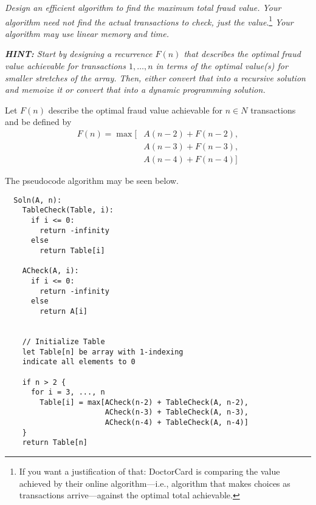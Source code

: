 \documentclass[11pt, oneside]{article}   	%
\theoremstyle{definition}
\theoremstyle{remark}
\begin{document}
\textit{Design an efficient algorithm to find the maximum total fraud
value. Your algorithm need not find the actual transactions to check, just the value}.\footnote{If you want a justification of that: DoctorCard is comparing the value achieved by their online algorithm---i.e., algorithm that makes choices as transactions arrive---against the optimal total achievable.} \textit{Your algorithm may use linear memory and time.}

\textit{\textbf{HINT:} Start by designing a recurrence $F(n)$ that describes the optimal fraud value achievable for transactions $1,\ldots,n$ in terms of the optimal value(s) for smaller stretches of the array. Then,
either convert that into a recursive solution and memoize it or convert that into a dynamic programming solution.}

Let $F(n)$ describe the optimal fraud value achievable for $n\in {N}$ transactions and be defined by
\begin{align*}
	F(n) = \max[&A(n-2) + F(n-2), \\
	& A(n-3) + F(n-3), \\
	& A(n-4) + F(n-4)]
\end{align*}

The pseudocode algorithm may be seen below.
\cleardoublepage
\begin{verbatim}
  Soln(A, n):
    TableCheck(Table, i):
      if i <= 0:
        return -infinity
      else
        return Table[i]
    
    ACheck(A, i):
      if i <= 0:
        return -infinity
      else
        return A[i]
    
    
    // Initialize Table
    let Table[n] be array with 1-indexing
    indicate all elements to 0
    
    if n > 2 {
      for i = 3, ..., n
        Table[i] = max[ACheck(n-2) + TableCheck(A, n-2),
                       ACheck(n-3) + TableCheck(A, n-3),
                       ACheck(n-4) + TableCheck(A, n-4)]
    }
    return Table[n]
\end{verbatim}


\clearpage
\end{document}
